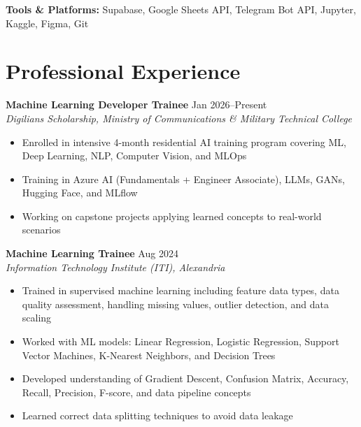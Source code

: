 \documentclass[11pt,a4paper]{article}
\begin{document}
\vspace{6pt}

\textbf{Tools \& Platforms:} Supabase, Google Sheets API, Telegram Bot API, Jupyter, Kaggle, Figma, Git

\section*{Professional Experience}

\textbf{Machine Learning Developer Trainee} \hfill Jan 2026--Present\\
\textit{Digilians Scholarship, Ministry of Communications \& Military Technical College}
\begin{itemize}[leftmargin=0.5cm, itemsep=1pt, topsep=2pt, label={-}]
    \item Enrolled in intensive 4-month residential AI training program covering ML, Deep Learning, NLP, Computer Vision, and MLOps
    \item Training in Azure AI (Fundamentals + Engineer Associate), LLMs, GANs, Hugging Face, and MLflow
    \item Working on capstone projects applying learned concepts to real-world scenarios
\end{itemize}

\vspace{8pt}

\textbf{Machine Learning Trainee} \hfill Aug 2024\\
\textit{Information Technology Institute (ITI), Alexandria}
\begin{itemize}[leftmargin=0.5cm, itemsep=1pt, topsep=2pt, label={-}]
    \item Trained in supervised machine learning including feature data types, data quality assessment, handling missing values, outlier detection, and data scaling
    \item Worked with ML models: Linear Regression, Logistic Regression, Support Vector Machines, K-Nearest Neighbors, and Decision Trees
    \item Developed understanding of Gradient Descent, Confusion Matrix, Accuracy, Recall, Precision, F-score, and data pipeline concepts
    \item Learned correct data splitting techniques to avoid data leakage
\end{itemize}
\end{document}
